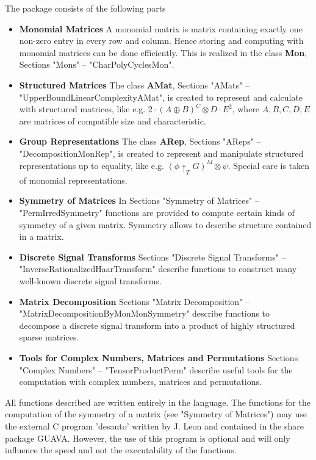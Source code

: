 The package {\AREP} consists of the following parts\:
\begin{itemize}
\item {\bf Monomial Matrices\:} A monomial matrix is matrix 
containing exactly one non-zero entry in every row and column. 
Hence storing and computing with monomial matrices can be done 
efficiently. This is realized in the class {\bf Mon}, 
Sections "Mons" -- "CharPolyCyclesMon". 

\item{\bf Structured Matrices\:} The class {\bf AMat}, 
Sections "AMats" -- "UpperBoundLinearComplexityAMat", is created to 
represent and calculate with structured matrices, like e.g. 
$2\cdot(A\oplus B)^C\otimes D\cdot E^2$, where $A, B, C, D, E$ are 
matrices of compatible size and characteristic. 

\item {\bf Group Representations\:} The class {\bf ARep}, 
Sections "AReps" -- "DecompositionMonRep", is created to 
represent and manipulate structured representations up to 
equality, like e.g. $(\phi\uparrow_T G)^M\otimes\psi$. 
Special care is taken of monomial representations.

\item {\bf Symmetry of Matrices\:} In 
Sections "Symmetry of Matrices" -- "PermIrredSymmetry" 
functions are provided 
to compute certain kinds of symmetry of a given matrix. 
Symmetry allows to describe structure contained in a matrix.

\item {\bf Discrete Signal Transforms\:} 
Sections "Discrete Signal Transforms" -- 
"InverseRationalizedHaarTransform" describe functions to 
construct many well-known discrete signal transforms.

\item {\bf Matrix Decomposition\:} 
Sections "Matrix Decomposition" -- 
"MatrixDecompositionByMonMonSymmetry" describe functions
to decompose a discrete signal transform into a product 
of highly structured sparse matrices.

\item {\bf Tools for Complex Numbers, Matrices and Permutations\:} 
Sections "Complex Numbers" -- "TensorProductPerm" describe
useful tools for the computation with complex numbers, matrices
and permutations.
\end{itemize}

All functions described are written entirely in the 
{\GAP} language. The functions for the computation of
the symmetry of a matrix (see "Symmetry of Matrices") 
may use the external C program 'desauto' written by J. Leon
and contained in the share package {\sf GUAVA}.
However, the use of this program is optional and will only 
influence the speed and not the executability of the functions.

